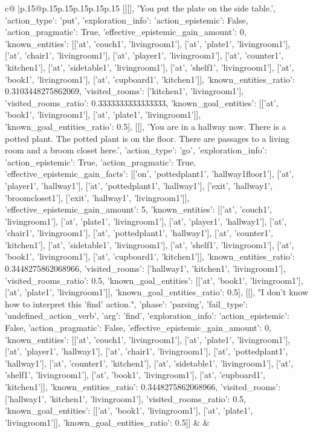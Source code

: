 \documentclass{article}
\begin{document}
{\begin{supertabular}{c@{$\;$}|p{.15\linewidth}@{}p{.15\linewidth}p{.15\linewidth}p{.15\linewidth}p{.15\linewidth}p{.15\linewidth}}
{{{	 [[[], 'You put the plate on the side table.', {'action_type': 'put', 'exploration_info': {'action_epistemic': False, 'action_pragmatic': True, 'effective_epistemic_gain_amount': 0, 'known_entities': [['at', 'couch1', 'livingroom1'], ['at', 'plate1', 'livingroom1'], ['at', 'chair1', 'livingroom1'], ['at', 'player1', 'livingroom1'], ['at', 'counter1', 'kitchen1'], ['at', 'sidetable1', 'livingroom1'], ['at', 'shelf1', 'livingroom1'], ['at', 'book1', 'livingroom1'], ['at', 'cupboard1', 'kitchen1']], 'known_entities_ratio': 0.3103448275862069, 'visited_rooms': ['kitchen1', 'livingroom1'], 'visited_rooms_ratio': 0.3333333333333333, 'known_goal_entities': [['at', 'book1', 'livingroom1'], ['at', 'plate1', 'livingroom1']], 'known_goal_entities_ratio': 0.5}}], [[], 'You are in a hallway now. There is a potted plant. The potted plant is on the floor. There are passages to a living room and a broom closet here.', {'action_type': 'go', 'exploration_info': {'action_epistemic': True, 'action_pragmatic': True, 'effective_epistemic_gain_facts': [['on', 'pottedplant1', 'hallway1floor1'], ['at', 'player1', 'hallway1'], ['at', 'pottedplant1', 'hallway1'], ['exit', 'hallway1', 'broomcloset1'], ['exit', 'hallway1', 'livingroom1']], 'effective_epistemic_gain_amount': 5, 'known_entities': [['at', 'couch1', 'livingroom1'], ['at', 'plate1', 'livingroom1'], ['at', 'player1', 'hallway1'], ['at', 'chair1', 'livingroom1'], ['at', 'pottedplant1', 'hallway1'], ['at', 'counter1', 'kitchen1'], ['at', 'sidetable1', 'livingroom1'], ['at', 'shelf1', 'livingroom1'], ['at', 'book1', 'livingroom1'], ['at', 'cupboard1', 'kitchen1']], 'known_entities_ratio': 0.3448275862068966, 'visited_rooms': ['hallway1', 'kitchen1', 'livingroom1'], 'visited_rooms_ratio': 0.5, 'known_goal_entities': [['at', 'book1', 'livingroom1'], ['at', 'plate1', 'livingroom1']], 'known_goal_entities_ratio': 0.5}}], [[], "I don't know how to interpret this 'find' action.", {'phase': 'parsing', 'fail_type': 'undefined_action_verb', 'arg': 'find', 'exploration_info': {'action_epistemic': False, 'action_pragmatic': False, 'effective_epistemic_gain_amount': 0, 'known_entities': [['at', 'couch1', 'livingroom1'], ['at', 'plate1', 'livingroom1'], ['at', 'player1', 'hallway1'], ['at', 'chair1', 'livingroom1'], ['at', 'pottedplant1', 'hallway1'], ['at', 'counter1', 'kitchen1'], ['at', 'sidetable1', 'livingroom1'], ['at', 'shelf1', 'livingroom1'], ['at', 'book1', 'livingroom1'], ['at', 'cupboard1', 'kitchen1']], 'known_entities_ratio': 0.3448275862068966, 'visited_rooms': ['hallway1', 'kitchen1', 'livingroom1'], 'visited_rooms_ratio': 0.5, 'known_goal_entities': [['at', 'book1', 'livingroom1'], ['at', 'plate1', 'livingroom1']], 'known_goal_entities_ratio': 0.5}}]] 
	  } 
	   } 
	   } 
	 & & \\ 
 


\end{supertabular}}
\end{document}
